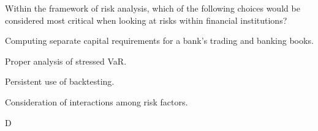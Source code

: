 \documentclass{article}
\newcounter{question} %
\begin{document}
\begin{question}
    Within the framework of risk analysis, which of the following choices would be considered most critical when looking at risks within financial institutions?
\end{question}

\begin{choices}
    \item Computing separate capital requirements for a bank's trading and banking books.
    \item Proper analysis of stressed VaR.
    \item Persistent use of backtesting.
    \item Consideration of interactions among risk factors.
\end{choices}

\begin{correctanswer}
    D
\end{correctanswer}
\end{document}
